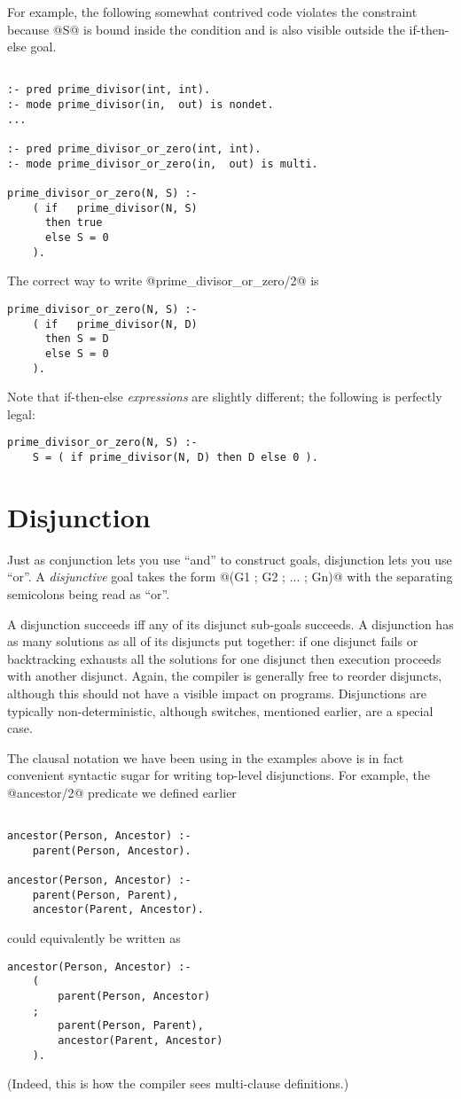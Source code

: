 For example, the following somewhat contrived code violates
the constraint because @S@ is bound inside the condition and is
also visible outside the if-then-else goal.
\begin{verbatim}

:- pred prime_divisor(int, int).
:- mode prime_divisor(in,  out) is nondet.
...

:- pred prime_divisor_or_zero(int, int).
:- mode prime_divisor_or_zero(in,  out) is multi.

prime_divisor_or_zero(N, S) :-
    ( if   prime_divisor(N, S)
      then true
      else S = 0
    ).

\end{verbatim}
The correct way to write @prime_divisor_or_zero/2@ is
\begin{verbatim}
prime_divisor_or_zero(N, S) :-
    ( if   prime_divisor(N, D)
      then S = D
      else S = 0
    ).
\end{verbatim}
Note that if-then-else \emph{expressions} are slightly different;
the following is perfectly legal:
\begin{verbatim}
prime_divisor_or_zero(N, S) :-
    S = ( if prime_divisor(N, D) then D else 0 ).
\end{verbatim}

\section{Disjunction}

Just as conjunction lets you use ``and'' to construct goals,
disjunction lets you use ``or''.  A \emph{disjunctive} goal takes the
form @(G1 ; G2 ; ... ; Gn)@ with the separating semicolons being
read as ``or''.

A disjunction succeeds iff any of its disjunct sub-goals
succeeds.  A disjunction has as many solutions as all of its
disjuncts put together: if one disjunct fails or backtracking
exhausts all the solutions for one disjunct then execution
proceeds with another disjunct.  Again, the compiler is
generally free to reorder disjuncts, although this should not
have a visible impact on programs.  Disjunctions are typically
non-deterministic, although switches, mentioned earlier, are a
special case.


The clausal notation we have been using in the examples above
is in fact convenient syntactic sugar for writing top-level
disjunctions.  For example, the @ancestor/2@ predicate we
defined earlier
\begin{verbatim}

ancestor(Person, Ancestor) :-
    parent(Person, Ancestor).

ancestor(Person, Ancestor) :-
    parent(Person, Parent),
    ancestor(Parent, Ancestor).
\end{verbatim}
could equivalently be written as
\begin{verbatim}
ancestor(Person, Ancestor) :-
    (
        parent(Person, Ancestor)
    ;
        parent(Person, Parent),
        ancestor(Parent, Ancestor)
    ).
\end{verbatim}
(Indeed, this is how the compiler sees multi-clause
definitions.)

